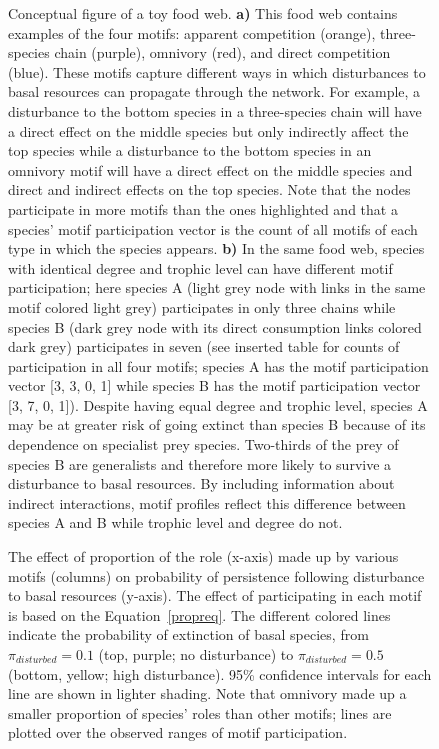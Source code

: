 \documentclass[12pt]{article}
\begin{document}
\begin{spacing}{2.0}
        \begin{figure}[hb!]
        \centering
        \caption{Conceptual figure of a toy food web. \textbf{a)} This food web contains examples of the four motifs: apparent competition (orange), three-species chain (purple), omnivory (red), and direct competition (blue). These motifs capture different ways in which disturbances to basal resources can propagate through the network. For example, a disturbance to the bottom species in a three-species chain will have a direct effect on the middle species but only indirectly affect the top species while a disturbance to the bottom species in an omnivory motif will have a direct effect on the middle species and direct and indirect effects on the top species. 
        Note that the nodes participate in more motifs than the ones highlighted and that a species' motif participation vector is the count of all motifs of each type in which the species appears. \textbf{b)} In the same food web, species with identical degree and trophic level can have different motif participation; here species A (light grey node with links in the same motif colored light grey) participates in only three chains while species B (dark grey node with its direct consumption links colored dark grey) participates in seven (see inserted table for counts of participation in all four motifs; species A has the motif participation vector [3, 3, 0, 1] while species B has the motif participation vector [3, 7, 0, 1]).
        Despite having equal degree and trophic level, species A may be at greater risk of going extinct than species B because of its dependence on specialist prey species. Two-thirds of the prey of species B are generalists and therefore more likely to survive a disturbance to basal resources. By including information about indirect interactions, motif profiles reflect this difference between species A and B while trophic level and degree do not.}
    \label{fig:concept}
    \end{figure}


        \begin{figure}[hb!]
        \centering
        \caption{The effect of proportion of the role (x-axis) made up by various motifs (columns) on probability of persistence following disturbance to basal resources (y-axis). The effect of participating in each motif is based on the Equation~\ref{propreq}. The different colored lines indicate the probability of extinction of basal species, from $\pi_{disturbed} = 0.1$ (top, purple; no disturbance) to $\pi_{disturbed} = 0.5$ (bottom, yellow; high disturbance). 95\% confidence intervals for each line are shown in lighter shading. Note that omnivory made up a smaller proportion of species' roles than other motifs; lines are plotted over the observed ranges of motif participation.}
    \label{fig:prop_lmer_all}
    \end{figure}
        

\end{spacing}
\end{document}
